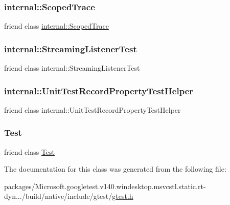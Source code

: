 \subsubsection{\texorpdfstring{internal::ScopedTrace}{internal::ScopedTrace}}
{\footnotesize\ttfamily friend class \mbox{\hyperlink{classtesting_1_1internal_1_1_scoped_trace}{internal\+::\+Scoped\+Trace}}\hspace{0.3cm}{\ttfamily [friend]}}

\mbox{\label{classtesting_1_1_unit_test_adc037d188dab349a94868991955c9cd4}} 
\subsubsection{\texorpdfstring{internal::StreamingListenerTest}{internal::StreamingListenerTest}}
{\footnotesize\ttfamily friend class internal\+::\+Streaming\+Listener\+Test\hspace{0.3cm}{\ttfamily [friend]}}

\mbox{\label{classtesting_1_1_unit_test_ae970f89a9f477a349fe5778be85ef42e}} 
\subsubsection{\texorpdfstring{internal::UnitTestRecordPropertyTestHelper}{internal::UnitTestRecordPropertyTestHelper}}
{\footnotesize\ttfamily friend class internal\+::\+Unit\+Test\+Record\+Property\+Test\+Helper\hspace{0.3cm}{\ttfamily [friend]}}

\mbox{\label{classtesting_1_1_unit_test_a5b78b1c2e1fa07ffed92da365593eaa4}} 
\subsubsection{\texorpdfstring{Test}{Test}}
{\footnotesize\ttfamily friend class \mbox{\hyperlink{classtesting_1_1_test}{Test}}\hspace{0.3cm}{\ttfamily [friend]}}



The documentation for this class was generated from the following file\+:\begin{DoxyCompactItemize}
\item 
packages/\+Microsoft.\+googletest.\+v140.\+windesktop.\+msvcstl.\+static.\+rt-\/dyn.../build/native/include/gtest/\mbox{\hyperlink{gtest_8h}{gtest.\+h}}\end{DoxyCompactItemize}
